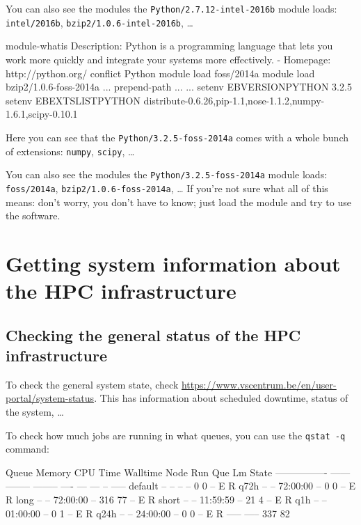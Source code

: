 You can also see the modules the \lstinline|Python/2.7.12-intel-2016b| module loads:
\lstinline|intel/2016b|, \lstinline|bzip2/1.0.6-intel-2016b|, \ldots

\else
\begin{prompt}
module-whatis	 Description: Python is a programming language that lets you work more quickly and integrate your systems more effectively. - Homepage: http://python.org/
conflict	 Python
module		 load foss/2014a
module		 load bzip2/1.0.6-foss-2014a
...
prepend-path ...
...
setenv		 EBVERSIONPYTHON 3.2.5
setenv		 EBEXTSLISTPYTHON distribute-0.6.26,pip-1.1,nose-1.1.2,numpy-1.6.1,scipy-0.10.1

\end{prompt}

Here you can see that the \lstinline|Python/3.2.5-foss-2014a| comes with a whole
bunch of extensions: \lstinline|numpy|, \lstinline|scipy|, \ldots

You can also see the modules the \lstinline|Python/3.2.5-foss-2014a| module loads:
\lstinline|foss/2014a|, \lstinline|bzip2/1.0.6-foss-2014a|, \ldots
\fi
If you're not sure what all of this means: don't worry, you don't have to know;
just load the module and try to use the software.

\section{Getting system information about the HPC infrastructure}

\subsection{Checking the general status of the HPC infrastructure}

To check the general system state, check \url{https://www.vscentrum.be/en/user-portal/system-status}.
This has information about scheduled downtime, status of the system, \ldots

To check how much jobs are running in what queues, you can use the \lstinline|qstat -q|
command:

\begin{prompt}
Queue            Memory CPU Time Walltime Node  Run Que Lm  State
---------------- ------ -------- -------- ----  --- --- --  -----
default            --      --       --      --    0   0 --   E R
q72h               --      --    72:00:00   --    0   0 --   E R
long               --      --    72:00:00   --  316  77 --   E R
short              --      --    11:59:59   --   21   4 --   E R
q1h                --      --    01:00:00   --    0   1 --   E R
q24h               --      --    24:00:00   --    0   0 --   E R
                                               ----- -----
                                                337  82
\end{prompt}

